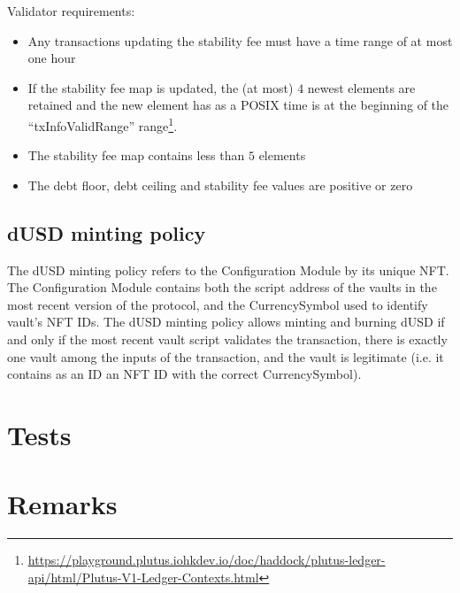 \documentclass{article} %
\begin{document}
Validator requirements:
\begin{itemize}
  \item Any transactions updating the stability fee must have a time range of at
    most one hour
  \item If the stability fee map is updated, the (at most) $4$ newest elements
    are retained and the new element has as a POSIX time is at the beginning of
    the ``txInfoValidRange'' range\footnote{
      \url{https://playground.plutus.iohkdev.io/doc/haddock/plutus-ledger-api/html/Plutus-V1-Ledger-Contexts.html}}.
  \item The stability fee map contains less than $5$ elements
  \item The debt floor, debt ceiling and stability fee values are positive or
    zero
\end{itemize}

\subsection{dUSD minting policy}

The dUSD minting policy refers to the Configuration Module by its unique NFT.
The Configuration Module contains both the script address of the vaults in the
most recent version of the protocol, and the CurrencySymbol used to identify
vault's NFT IDs. The dUSD minting policy allows minting and burning dUSD if and
only if the most recent vault script validates the transaction, there is exactly
one vault among the inputs of the transaction, and the vault is legitimate (i.e.
it contains as an ID an NFT ID with the correct CurrencySymbol).

\section{Tests}

\section{Remarks}
\end{document}
